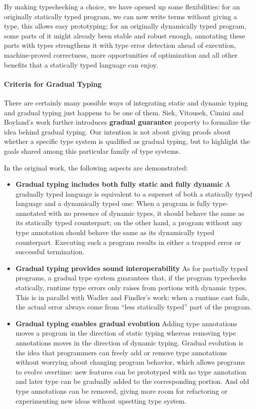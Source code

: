 By making typechecking a choice, we have opened up some flexibilities:
for an originally statically typed program, we can now write terms without giving a type,
this allows easy prototyping; for an originally dynamically typed program,
some parts of it might already been stable and robust enough, annotating these parts
with types strengthens it with type error detection ahead of execution, machine-proved correctness,
more opportunities of optimization and 
all other benefits that a statically typed language can enjoy.

\paragraph{Criteria for Gradual Typing}

There are certainly many possible ways of integrating static and dynamic typing
and gradual typing just happens to be one of them.
Siek, Vitousek, Cimini and Boyland's work \cite{siek2015refined}
further introduces \textbf{gradual guarantee} property
to formalize the idea behind gradual typing.
Our intention is not about giving proofs about whether a specific type system is qualified as
gradual typing, but to highlight the goals shared among this particular family of type systems.

In the original work, the following aspects are demonstrated:

\begin{itemize}
	\item \textbf{Gradual typing includes both fully static and fully dynamic}
	A gradually typed language is equivalent to a superset of both a statically typed
	language and a dynamically typed one:
	When a program is fully type-annotated with no presence of dynamic types,
	it should behave the same as its statically typed counterpart;
	on the other hand, a program without any type annotation should behave the same
	as its dynamically typed counterpart. Executing such a program
	results in either a trapped error \cite{luca1997} or successful termination.
	\item \textbf{Gradual typing provides sound interoperability}
	As for partially typed programs, a gradual type system guarantees that,
	if the program typechecks statically, runtime type errors only raises from
	portions with dynamic types.
	This is in parallel with Wadler and Findler's work\cite{wadler2009well}:
	when a runtime cast fails, the actual error
	always come from ``less statically typed'' part of the program.
	\item \textbf{Gradual typing enables gradual evolution}
	Adding type annotations moves a program in the direction of static typing
	whereas removing type annotations moves in the direction of dynamic typing.
	Gradual evolution is the idea that programmers can freely add or remove type annotations
	without worrying about changing program behavior, which allows programs to evolve overtime:
	new features can be prototyped with no type annotation and later type can be gradually
	added to the corresponding portion. And old type annotations can be removed,
	giving more room for refactoring or experimenting new ideas without upsetting type system.
\end{itemize}

